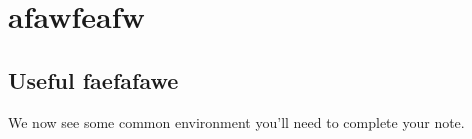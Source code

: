 \chapter{afawfeafw}
\section{Useful faefafawe}
We now see some common environment you'll need to complete your note.
